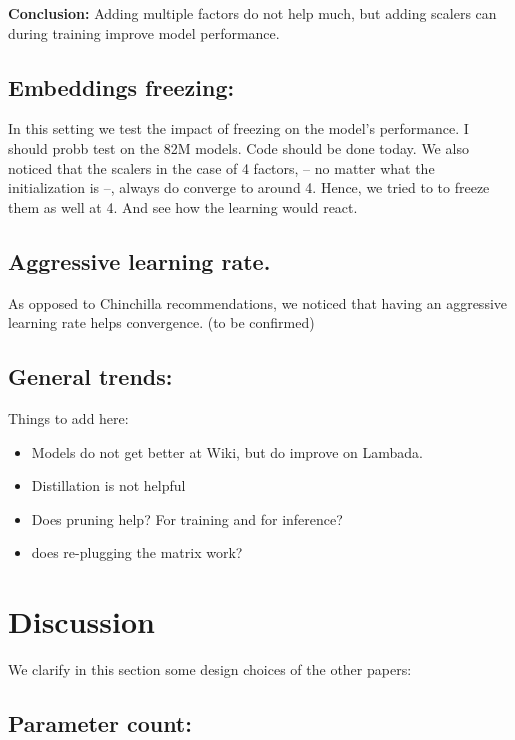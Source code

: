 \documentclass{article}
\begin{document}
{\begin{table}[h]
\end{table}

\textbf{Conclusion:} Adding multiple factors do not help much, but adding scalers can during training improve model performance.

\subsection{Embeddings freezing:}%
\label{sub:Embeddings freezing:}

In this setting we test the impact of freezing on the model's performance. I should probb test on the 82M models. Code should be done today. We also noticed that the scalers in the case of 4 factors, -- no matter what the initialization is --, always do converge to around 4. Hence, we tried to to freeze them as well at 4. And see how the learning would react.


\subsection{Aggressive learning rate.}%

As opposed to Chinchilla recommendations, we noticed that having an aggressive learning rate helps convergence. (to be confirmed)

\subsection{General trends:}%

Things to add here:

\begin{itemize}
	\item Models do not get better at Wiki, but do improve on Lambada.
	\item Distillation is not helpful 
	\item Does pruning help? For training and for inference?
	\item does re-plugging the matrix work? 
\end{itemize}

\section{Discussion}%
\label{sec:Discussion}

We clarify in this section some design choices of the other papers:

\subsection{Parameter count:}%
\label{sub:Parameter count:}

}
\end{document}

